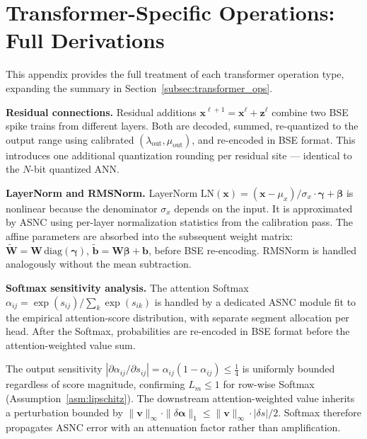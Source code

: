 \documentclass{article}
\theoremstyle{plain}
\theoremstyle{definition}
\theoremstyle{remark}
\begin{document}



\appendix

\section{Transformer-Specific Operations: Full Derivations}
\label{app:transformer_ops}

This appendix provides the full treatment of each transformer operation type, expanding the summary in Section~\ref{subsec:transformer_ops}.

\noindent\textbf{Residual connections.}
Residual additions $\mathbf{x}^{\ell+1} = \mathbf{x}^\ell + \mathbf{z}^\ell$ combine two BSE spike trains from different layers. Both are decoded, summed, re-quantized to the output range using calibrated $(\lambda_\mathrm{out}, \mu_\mathrm{out})$, and re-encoded in BSE format. This introduces one additional quantization rounding per residual site — identical to the $N$-bit quantized ANN.

\noindent\textbf{LayerNorm and RMSNorm.}
LayerNorm $\mathrm{LN}(\mathbf{x}) = (\mathbf{x}-\mu_x)/\sigma_x \cdot \boldsymbol{\gamma} + \boldsymbol{\beta}$ is nonlinear because the denominator $\sigma_x$ depends on the input. It is approximated by ASNC using per-layer normalization statistics from the calibration pass. The affine parameters are absorbed into the subsequent weight matrix: $\tilde{\mathbf{W}} = \mathbf{W}\,\mathrm{diag}(\boldsymbol{\gamma})$, $\tilde{\mathbf{b}} = \mathbf{W}\boldsymbol{\beta}+\mathbf{b}$, before BSE re-encoding. RMSNorm is handled analogously without the mean subtraction.

\noindent\textbf{Softmax sensitivity analysis.}
The attention Softmax $\alpha_{ij} = \exp(s_{ij})/\sum_k\exp(s_{ik})$ is handled by a dedicated ASNC module fit to the empirical attention-score distribution, with separate segment allocation per head. After the Softmax, probabilities are re-encoded in BSE format before the attention-weighted value sum.

The output sensitivity $|\partial\alpha_{ij}/\partial s_{ij}| = \alpha_{ij}(1-\alpha_{ij}) \le \tfrac{1}{4}$ is uniformly bounded regardless of score magnitude, confirming $L_m \le 1$ for row-wise Softmax (Assumption~\ref{asm:lipschitz}). The downstream attention-weighted value inherits a perturbation bounded by $\|\mathbf{v}\|_\infty \cdot \|\delta\boldsymbol{\alpha}\|_1 \le \|\mathbf{v}\|_\infty \cdot |\delta s|/2$. Softmax therefore propagates ASNC error with an attenuation factor rather than amplification.
\end{document}
